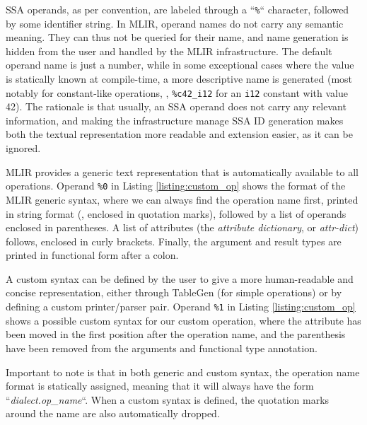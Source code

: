 SSA operands, as per convention, are labeled through a “\texttt{\%}“ character, followed by some identifier string. In MLIR, operand names do not carry any semantic meaning. They can thus not be queried for their name, and name generation is hidden from the user and handled by the MLIR infrastructure. The default operand name is just a number, while in some exceptional cases where the value is statically known at compile-time, a more descriptive name is generated (most notably for constant-like operations, \eg, \texttt{\%c42\_i12} for an \texttt{i12} constant with value 42). The rationale is that usually, an SSA operand does not carry any relevant information, and making the infrastructure manage SSA ID generation makes both the textual representation more readable and extension easier, as it can be ignored.

MLIR provides a generic text representation that is automatically available to all operations. Operand \texttt{\%0} in Listing \ref{listing:custom_op} shows the format of the MLIR generic syntax, where we can always find the operation name first, printed in string format (\ie, enclosed in quotation marks), followed by a list of operands enclosed in parentheses. A list of attributes (the \textit{attribute dictionary}, or \textit{attr-dict}) follows, enclosed in curly brackets. Finally, the argument and result types are printed in functional form after a colon.

A custom syntax can be defined by the user to give a more human-readable and concise representation, either through TableGen (for simple operations) or by defining a custom printer/parser pair. Operand \texttt{\%1} in Listing \ref{listing:custom_op} shows a possible custom syntax for our custom operation, where the attribute has been moved in the first position after the operation name, and the parenthesis have been removed from the arguments and functional type annotation.

Important to note is that in both generic and custom syntax, the operation name format is statically assigned, meaning that it will always have the form “\textit{dialect.op\_name}“. When a custom syntax is defined, the quotation marks around the name are also automatically dropped.



